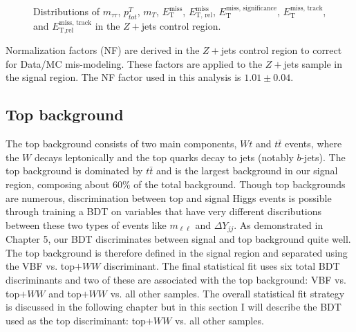 \begin{figure}[!h]
{  }\hfill
  \hfill
{\caption{Distributions of $m_{\tau\tau}$, $p^T_{tot}$, $m_T$, $\ensuremath{E_{\text{T}}^{\text{miss}}}$, $\ensuremath{E_{\text{T, rel}}^{\text{miss}}}$, $\ensuremath{E_{\text{T}}^{\text{miss, significance}}}$, $\ensuremath{E_{\text{T}}^{\text{miss, track}}}$, and $\ensuremath{E_{\text{T,rel}}^{\text{miss, track}}}$ in the $Z+$jets control region.
\label{fig:DYCR3}}}
\end{figure}

Normalization factors (NF) are derived in the $Z+$jets control region to correct for Data/MC mis-modeling. These factors are applied to the $Z+$jets sample in the signal region. The NF factor used in this analysis is $1.01 \pm 0.04$. 

\subsection{Top background}
The top background consists of two main components, $Wt$ and $t\bar{t}$ events, where the $W$ decays leptonically and the top quarks decay to jets (notably $b$-jets). The top background is dominated by $t\bar{t}$ and is the largest background in our signal region, composing about $60\%$ of the total background. Though top backgrounds are numerous, discrimination between top and signal Higgs events is possible through training a BDT on variables that have very different discributions between these two types of events like $m_{\ell\ell}$ and $\Delta Y_{jj}$. As demonstrated in Chapter 5, our BDT discriminates between signal and top background quite well. The top background is therefore defined in the signal region and separated using the VBF vs. top$+WW$ discriminant. The final statistical fit uses six total BDT discriminants and two of these are associated with the top background: VBF vs. top$+WW$ and top$+WW$ vs. all other samples. The overall statistical fit strategy is discussed in the following chapter but in this section I will describe the BDT used as the top discriminant: top$+WW$ vs. all other samples. 

